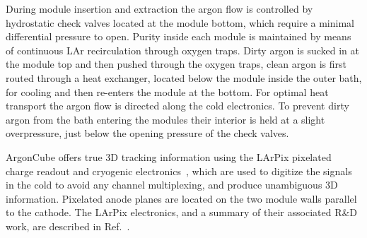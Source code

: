 During module insertion and extraction the argon flow is controlled by hydrostatic check valves located at the module bottom, which require a minimal differential pressure to open. Purity inside each module is maintained by means of continuous LAr recirculation through oxygen traps. Dirty argon is sucked in at the module top and then pushed through the oxygen traps, clean argon is first routed through a heat exchanger, located below the module inside the outer bath, for cooling and then re-enters the module at the bottom. For optimal heat transport the argon flow is directed along the cold electronics. To prevent dirty argon from the bath entering the modules their interior is held at a slight overpressure, just below the opening pressure of the check valves. 

ArgonCube offers true 3D tracking information using the LArPix pixelated charge readout and cryogenic electronics~\cite{larpix}, which are used to digitize the signals in the cold to avoid any channel multiplexing, and produce unambiguous 3D information. Pixelated anode planes are located on the two module walls parallel to the cathode.  The LArPix electronics, and a summary of their associated R\&D work, are described in Ref.~\cite{larpix}.

